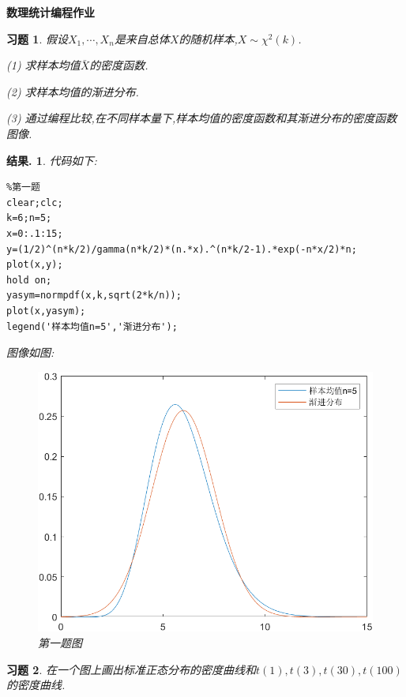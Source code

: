 \documentclass[a4paper,oneside,12pt]{ctexart}
\theoremstyle{plain}
\newtheorem{exercise}{习题}
\theoremstyle{nonumberplain}
\newtheorem{solution}{结果.}
\begin{document}
    \begin{center}
        \bfseries\LARGE
        数理统计编程作业
    \end{center}

    \begin{exercise}
        \label{ex:1}
        假设$X_1,\cdots,X_n$是来自总体$X$的随机样本,$X\sim\chi^2(k)$.

        (1) 求样本均值$\bar{X}$的密度函数.

        (2) 求样本均值的渐进分布.

        (3) 通过编程比较,在不同样本量下,样本均值的密度函数和其渐进分布的密度函数图像.
    \end{exercise}

    \begin{solution}
        代码如下:
        \begin{lstlisting}
%第一题
clear;clc;
k=6;n=5;
x=0:.1:15;
y=(1/2)^(n*k/2)/gamma(n*k/2)*(n.*x).^(n*k/2-1).*exp(-n*x/2)*n;
plot(x,y);
hold on;
yasym=normpdf(x,k,sqrt(2*k/n));
plot(x,yasym);
legend('样本均值n=5','渐进分布');
        \end{lstlisting}

        图像如图:
        \begin{figure}[H]
            \centering
            \includegraphics[scale=0.7]{第一问.png}
            \caption{第一题图}
        \end{figure}
    \end{solution}

    \begin{exercise}
        \label{ex:2}
        在一个图上画出标准正态分布的密度曲线和$t(1),t(3),t(30),t(100)$的密度曲线.
    \end{exercise}
\end{document}
